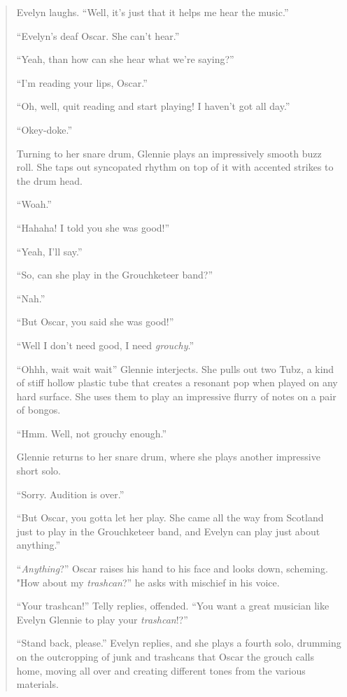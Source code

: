 \documentclass[12pt,letterpaper]{article}
\begin{document}
\begin{quote}
	Evelyn laughs. ``Well, it's just that it helps me hear the music.''

	``Evelyn's deaf Oscar. She can't hear.''

	``Yeah, than how can she hear what we're saying?''

	``I'm reading your lips, Oscar.''

	``Oh, well, quit reading and start playing! I haven't got all day.''

	``Okey-doke.''

	Turning to her snare drum, Glennie plays an impressively smooth buzz 
	roll. She taps out syncopated rhythm on top of it with accented strikes
	to the drum head.

	``Woah.''

	``Hahaha! I told you she was good!''

	``Yeah, I'll say.''

	``So, can she play in the Grouchketeer band?''

	``Nah.''

	``But Oscar, you said she was good!''

	``Well I don't need good, I need \textit{grouchy}.''

	``Ohhh, wait wait wait'' Glennie interjects. She pulls out two Tubz, a 
	kind of stiff hollow plastic tube that creates a resonant pop when 
	played on any hard surface. She uses them to play an impressive flurry
	of notes on a pair of bongos.  

	``Hmm. Well, not grouchy enough.''

	Glennie returns to her snare drum, where she plays another impressive 
	short solo.  

	``Sorry. Audition is over.''

	``But Oscar, you gotta let her play. She came all the way from Scotland
	just to play in the Grouchketeer band, and Evelyn can play just about 
	anything.''

	``\textit{Anything}?'' Oscar raises his hand to his face and looks down,
	 scheming. "How about my \textit{trashcan}?'' he asks with mischief in 
	his voice.

	``Your trashcan!'' Telly replies, offended. ``You want a great musician
	like Evelyn Glennie to play your \textit{trashcan}!?''

	``Stand back, please.'' Evelyn replies, and she plays a fourth solo, 
	drumming on the outcropping of junk and trashcans that Oscar the grouch
	calls home, moving all over and creating different tones from the 
	various materials. 


\end{quote}
\end{document}
